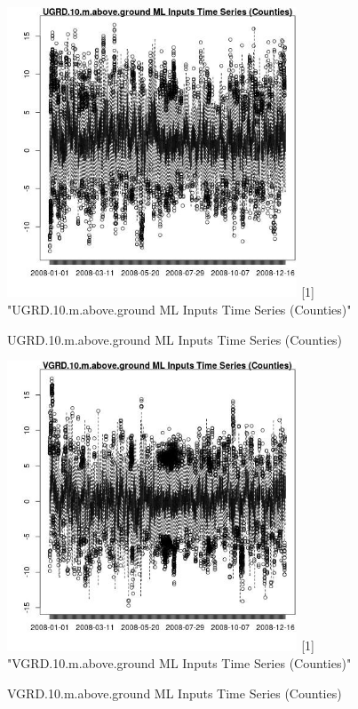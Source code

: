 \begin{figure} 
\centering  
\includegraphics[width=0.77\textwidth]{Code_Outputs/ML_input_report_ML_input_CountyGeometricCentroids_Locations_Dates_part_c_2008-01-01to2008-12-31_UGRD.10.m.above.groundTS.jpg} 
[1] "UGRD.10.m.above.ground ML Inputs Time Series (Counties)"
\caption{\label{fig:ML_input_report_ML_input_CountyGeometricCentroids_Locations_Dates_part_c_2008-01-01to2008-12-31UGRD.10.m.above.groundTS}UGRD.10.m.above.ground ML Inputs Time Series (Counties)} 
\end{figure} 
 

\begin{figure} 
\centering  
\includegraphics[width=0.77\textwidth]{Code_Outputs/ML_input_report_ML_input_CountyGeometricCentroids_Locations_Dates_part_c_2008-01-01to2008-12-31_VGRD.10.m.above.groundTS.jpg} 
[1] "VGRD.10.m.above.ground ML Inputs Time Series (Counties)"
\caption{\label{fig:ML_input_report_ML_input_CountyGeometricCentroids_Locations_Dates_part_c_2008-01-01to2008-12-31VGRD.10.m.above.groundTS}VGRD.10.m.above.ground ML Inputs Time Series (Counties)} 
\end{figure} 
 

